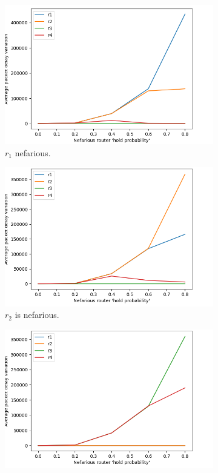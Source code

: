 \begin{figure}
    \centering
    \begin{subfigure}{0.475\textwidth}
        \includegraphics[width=\textwidth]{figs/results/true_PDV_1.png}
        \caption[]{$r_1$ nefarious.}
    \end{subfigure}
    \begin{subfigure}{0.475\textwidth}
        \includegraphics[width=\textwidth]{figs/results/true_PDV_2.png}
        \caption[]{$r_2$ is nefarious.}
    \end{subfigure}
    \hfill
    \centering
    \begin{subfigure}{0.475\textwidth}
        \includegraphics[width=\textwidth]{figs/results/true_PDV_3.png}

\end{subfigure}
\end{figure}
